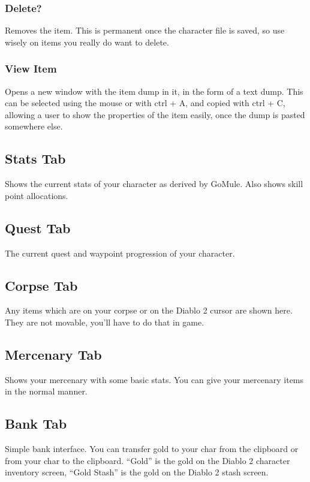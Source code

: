 \documentclass[a4paper,10pt]{article}
\begin{document}
\subsubsection{Delete?}

Removes the item. This is permanent once the character file is saved, so use wisely on items you really do want to delete.

\subsubsection{View Item}

Opens a new window with the item dump in it, in the form of a text dump. This can be selected using the mouse or with ctrl + A, and copied with ctrl + C, allowing a user to show the properties of the item easily, once the dump is pasted somewhere else.

\subsection{Stats Tab}

Shows the current stats of your character as derived by GoMule. Also shows skill point allocations.

\subsection{Quest Tab}

The current quest and waypoint progression of your character.

\subsection{Corpse Tab}

Any items which are on your corpse or on the Diablo 2 cursor are shown here. They are not movable, you'll have to do that in game.

\subsection{Mercenary Tab}

Shows your mercenary with some basic stats. You can give your mercenary items in the normal manner.

\subsection{Bank Tab}

Simple bank interface. You can transfer gold to your char from the clipboard or from your char to the clipboard. ``Gold'' is the gold on the Diablo 2 character inventory screen, ``Gold Stash'' is the gold on the Diablo 2 stash screen.
\end{document}
